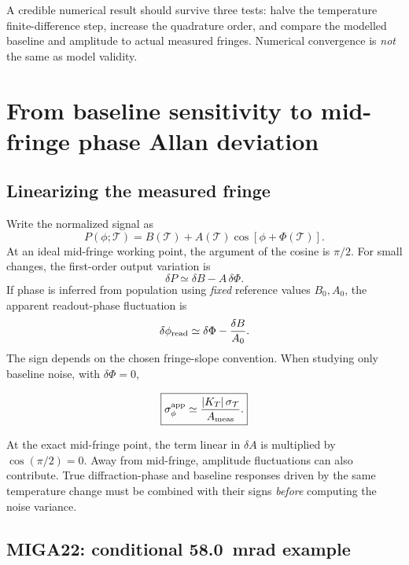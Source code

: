\documentclass[11pt,a4paper]{article}
\numberwithin{equation}{section}
\newcommand{\Tat}{\mathcal{T}}
\begin{document}
A credible numerical result should survive three tests: halve the temperature
finite-difference step, increase the quadrature order, and compare the
modelled baseline and amplitude to actual measured fringes. Numerical
convergence is \emph{not} the same as model validity.

\section{From baseline sensitivity to mid-fringe phase Allan deviation}

\subsection{Linearizing the measured fringe}

Write the normalized signal as
\begin{equation}\label{eq:fringe}
P(\phi;\Tat)=B(\Tat)+A(\Tat)\cos[\phi+\Phi(\Tat)].
\end{equation}
At an ideal mid-fringe working point, the argument of the cosine is $\pi/2$.
For small changes, the first-order output variation is
\begin{equation}
 \delta P\simeq\delta B-A\,\delta\Phi.
\end{equation}
If phase is inferred from population using \emph{fixed} reference values
$B_0,A_0$, the apparent readout-phase fluctuation is
\begin{equation}\label{eq:appphase}
\delta\phi_{\rm read}\simeq\delta\Phi-\frac{\delta B}{A_0}.
\end{equation}
The sign depends on the chosen fringe-slope convention. When studying only
baseline noise, with $\delta\Phi=0$,
\begin{keybox}
\begin{equation}\label{eq:appallan}
\boxed{\sigma_{\phi}^{\rm app}\simeq
 \frac{|K_T|\,\sigma_\Tat}{A_{\rm meas}}.}
\end{equation}
\end{keybox}
At the exact mid-fringe point, the term linear in $\delta A$ is multiplied
by $\cos(\pi/2)=0$. Away from mid-fringe, amplitude fluctuations can also
contribute. True diffraction-phase and baseline responses driven by the
same temperature change must be combined with their signs \emph{before}
computing the noise variance.

\subsection{MIGA22: conditional \SI{58.0}{mrad} example}
\end{document}
